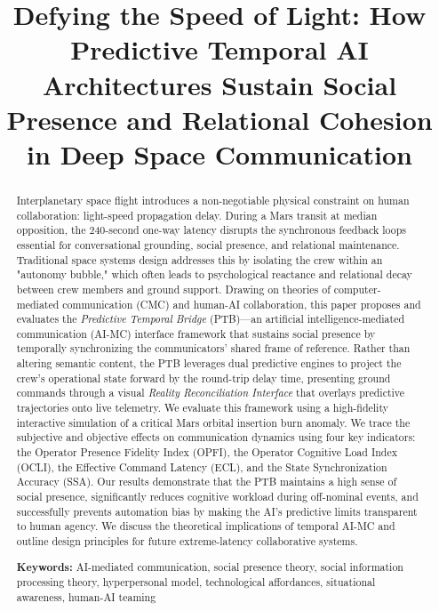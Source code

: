 \documentclass[12pt,a4paper]{article}
\title{\textbf{Defying the Speed of Light: How Predictive Temporal AI Architectures Sustain Social Presence and Relational Cohesion in Deep Space Communication}}
\date{}
\begin{document}
\maketitle
\thispagestyle{empty}

\begin{abstract}
Interplanetary space flight introduces a non-negotiable physical constraint on human collaboration: light-speed propagation delay. During a Mars transit at median opposition, the 240-second one-way latency disrupts the synchronous feedback loops essential for conversational grounding, social presence, and relational maintenance. Traditional space systems design addresses this by isolating the crew within an "autonomy bubble," which often leads to psychological reactance and relational decay between crew members and ground support. Drawing on theories of computer-mediated communication (CMC) and human-AI collaboration, this paper proposes and evaluates the \textit{Predictive Temporal Bridge} (PTB)---an artificial intelligence-mediated communication (AI-MC) interface framework that sustains social presence by temporally synchronizing the communicators' shared frame of reference. Rather than altering semantic content, the PTB leverages dual predictive engines to project the crew's operational state forward by the round-trip delay time, presenting ground commands through a visual \textit{Reality Reconciliation Interface} that overlays predictive trajectories onto live telemetry. We evaluate this framework using a high-fidelity interactive simulation of a critical Mars orbital insertion burn anomaly. We trace the subjective and objective effects on communication dynamics using four key indicators: the Operator Presence Fidelity Index (OPFI), the Operator Cognitive Load Index (OCLI), the Effective Command Latency (ECL), and the State Synchronization Accuracy (SSA). Our results demonstrate that the PTB maintains a high sense of social presence, significantly reduces cognitive workload during off-nominal events, and successfully prevents automation bias by making the AI's predictive limits transparent to human agency. We discuss the theoretical implications of temporal AI-MC and outline design principles for future extreme-latency collaborative systems.

\smallskip
\noindent\textbf{Keywords:} AI-mediated communication, social presence theory, social information processing theory, hyperpersonal model, technological affordances, situational awareness, human-AI teaming
\end{abstract}
\end{document}
